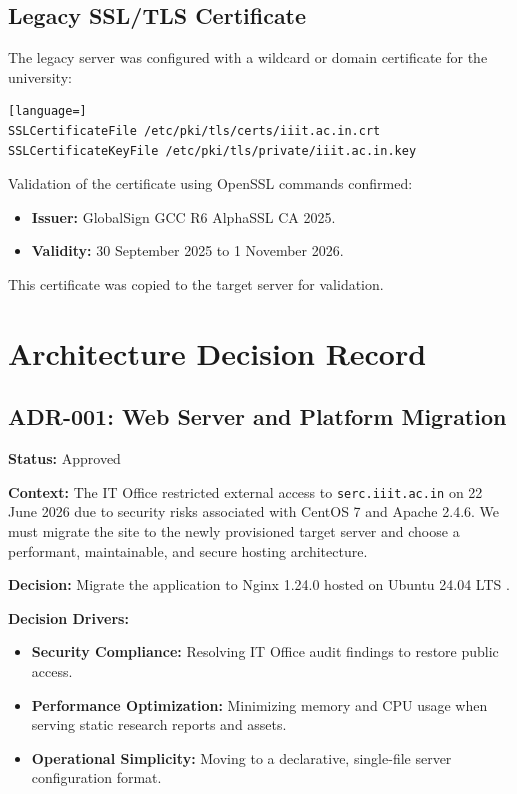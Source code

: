\documentclass[11pt,a4paper,DIV=16,headings=normal,parskip=half]{scrartcl}
\begin{document}
\subsection{Legacy SSL/TLS Certificate}
The legacy server was configured with a wildcard or domain certificate for the university:
\begin{lstlisting}[language=]
SSLCertificateFile /etc/pki/tls/certs/iiit.ac.in.crt
SSLCertificateKeyFile /etc/pki/tls/private/iiit.ac.in.key
\end{lstlisting}
Validation of the certificate using OpenSSL commands confirmed:
\begin{itemize}
\item \textbf{Issuer:} GlobalSign GCC R6 AlphaSSL CA 2025.
\item \textbf{Validity:} 30 September 2025 to 1 November 2026.
\end{itemize}
This certificate was copied to the target server for validation.

\section{Architecture Decision Record}

\subsection{ADR-001: Web Server and Platform Migration}

\textbf{Status:} Approved

\textbf{Context:}
The IT Office restricted external access to \texttt{serc.iiit.ac.in} on 22 June 2026 due to security risks associated with CentOS 7 and Apache 2.4.6. We must migrate the site to the newly provisioned target server and choose a performant, maintainable, and secure hosting architecture.

\textbf{Decision:}
Migrate the application to Nginx 1.24.0 \cite{nginx-docs} hosted on Ubuntu 24.04 LTS \cite{ubuntu-lts}.

\textbf{Decision Drivers:}
\begin{itemize}
\item \textbf{Security Compliance:} Resolving IT Office audit findings to restore public access.
\item \textbf{Performance Optimization:} Minimizing memory and CPU usage when serving static research reports and assets.
\item \textbf{Operational Simplicity:} Moving to a declarative, single-file server configuration format.
\end{itemize}
\end{document}
